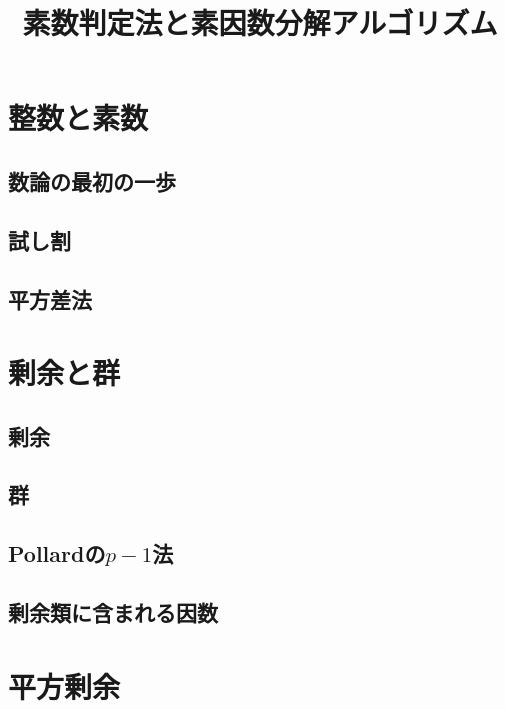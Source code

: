 
\title{素数判定法と素因数分解アルゴリズム}
\author{}
\date{}
\makeindex

\setcounter{notesNum}{1}
\maketitle
\begin{multicols}{2}
\setcounter{tocdepth}{3}
\tableofcontents
\end{multicols}
\newpage

\section{整数と素数}
\subsection{数論の最初の一歩}

\subsection{試し割}

\subsection{平方差法}


\section{剰余と群}
\subsection{剰余}

\subsection{群}

\subsection{Pollardの$p-1$法}

\subsection{剰余類に含まれる因数}


\section{平方剰余}
